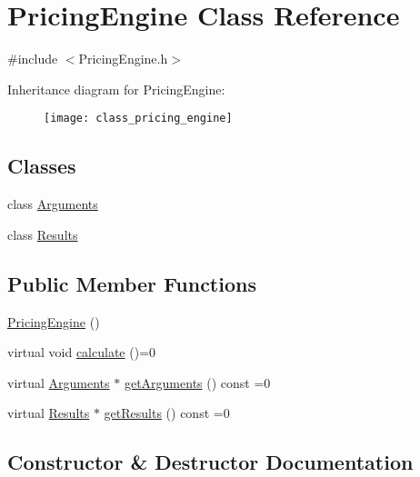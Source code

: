 \hypertarget{class_pricing_engine}{}\section{Pricing\+Engine Class Reference}
\label{class_pricing_engine}


{\ttfamily \#include $<$Pricing\+Engine.\+h$>$}

Inheritance diagram for Pricing\+Engine\+:\begin{figure}[H]
\begin{center}
\leavevmode
\texttt{[image: class\_pricing\_engine]}
\end{center}
\end{figure}
\subsection*{Classes}
\begin{DoxyCompactItemize}
\item 
class \hyperlink{class_pricing_engine_1_1_arguments}{Arguments}
\item 
class \hyperlink{class_pricing_engine_1_1_results}{Results}
\end{DoxyCompactItemize}
\subsection*{Public Member Functions}
\begin{DoxyCompactItemize}
\item 
\hyperlink{class_pricing_engine_abfd32778b0483e92db2e7cd00a2f9345}{Pricing\+Engine} ()
\item 
virtual void \hyperlink{class_pricing_engine_a733511ffc3cf5e4dc1fbc2a39208d8bd}{calculate} ()=0
\item 
virtual \hyperlink{class_pricing_engine_1_1_arguments}{Arguments} $\ast$ \hyperlink{class_pricing_engine_a399f4519f58b2ac1d108ce14d0058c97}{get\+Arguments} () const =0
\item 
virtual \hyperlink{class_pricing_engine_1_1_results}{Results} $\ast$ \hyperlink{class_pricing_engine_a73e2852ef4c28e92a402492e86717d0b}{get\+Results} () const =0
\end{DoxyCompactItemize}


\subsection{Constructor \& Destructor Documentation}
\hypertarget{class_pricing_engine_abfd32778b0483e92db2e7cd00a2f9345}{}\label{class_pricing_engine_abfd32778b0483e92db2e7cd00a2f9345} 
